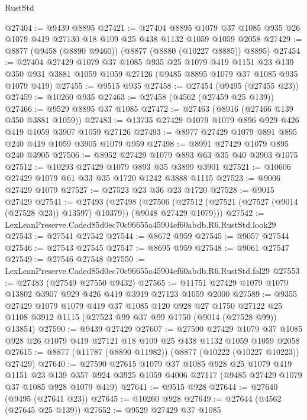 \begin{lexlean}{RustStd}
\begin{coremodule}
@27404 := @9439 @8895
@27421 := @27404
    @8895
    @1079
    @37
    @1085
    @935
    @26
    @1079
    @419
    @27130
    @18
    @109
    @25
    @438
    @1132
    @1059
    @1059
    @2058
@27429 := @8877 (@9458 (@8890 @9460)) (@8877 (@8880 (@10227 @8885)) @8895)
@27454 := @27404
    @27429
    @1079
    @37
    @1085
    @935
    @25
    @1079
    @419
    @1151
    @23
    @139
    @350
    @931
    @3881
    @1059
    @1059
    @27126
    (@9485 @8895 @1079 @37 @1085 @935 @1079 @419)
@27455 := @9515 @935
@27458 := @27454 (@9495 (@27455 @23))
@27459 := @10260 @935
@27463 := @27458 (@4562 (@27459 @25 @139))
@27466 := @9529 @8895 @37 @1085
@27472 := @27463 (@8916 (@27466 @139 @350 @3881 @1059))
@27483 := @13735 @27429 @1079 @1079 @896 @929 @426 @419 @1059 @3907 @1059 @27126
@27493 := @8977 @27429 @1079 @891 @895 @240 @419 @1059 @3905 @1079 @959
@27498 := @8991 @27429 @1079 @895 @240 @3905
@27506 := @8952 @27429 @1079 @893 @63 @35 @40 @3903 @1075
@27512 := @10293 @27429 @1079 @893 @35 @3899 @3901
@27521 := @10606 @27429 @1079 @61 @33 @35 @1720 @1242 @3888 @1115
@27523 := @9006 @27429 @1079
@27527 := @27523 @23 @36 @23 @1720
@27528 := @9015 @27429
@27541 := @27493
    (@27498
      (@27506 (@27512 (@27521 (@27527 (@9014 (@27528 @23)) @13597) @10379)) (@9048 @27429 @1079)))
@27542 := LexLeanPreserve.Caded85d0ec70c96655a45904ef60abdb.R6.RustStd.look29
@27543 := @27541 @27542
@27544 := @8672 @959
@27545 := @9057 @27544
@27546 := @27543 @27545
@27547 := @8695 @959
@27548 := @9061 @27547
@27549 := @27546 @27548
@27550 := LexLeanPreserve.Caded85d0ec70c96655a45904ef60abdb.R6.RustStd.fal29
@27553 := @27483 (@27549 @27550 @9432)
@27565 := @11751 @27429 @1079 @1079 @13802 @3907 @929 @426 @419 @3919 @27123 @1059 @2000
@27589 := @9355
    @27429
    @1079
    @1079
    @419
    @37
    @1085
    @120
    @928
    @27
    @1750
    @27122
    @25
    @1108
    @3912
    @1115
    (@27523 @99 @37 @99 @1750 (@9014 (@27528 @99)) @13854)
@27590 := @9439 @27429
@27607 := @27590
    @27429
    @1079
    @37
    @1085
    @928
    @26
    @1079
    @419
    @27121
    @18
    @109
    @25
    @438
    @1132
    @1059
    @1059
    @2058
@27615 := @8877 (@11787 (@8890 @11982)) (@8877 (@10222 (@10227 @10223)) @27429)
@27640 := @27590
    @27615
    @1079
    @37
    @1085
    @928
    @25
    @1079
    @419
    @1151
    @23
    @139
    @357
    @924
    @3925
    @1059
    @4006
    @27117
    (@9485 @27429 @1079 @37 @1085 @928 @1079 @419)
@27641 := @9515 @928
@27644 := @27640 (@9495 (@27641 @23))
@27645 := @10260 @928
@27649 := @27644 (@4562 (@27645 @25 @139))
@27652 := @9529 @27429 @37 @1085

\end{coremodule}
\end{lexlean}
